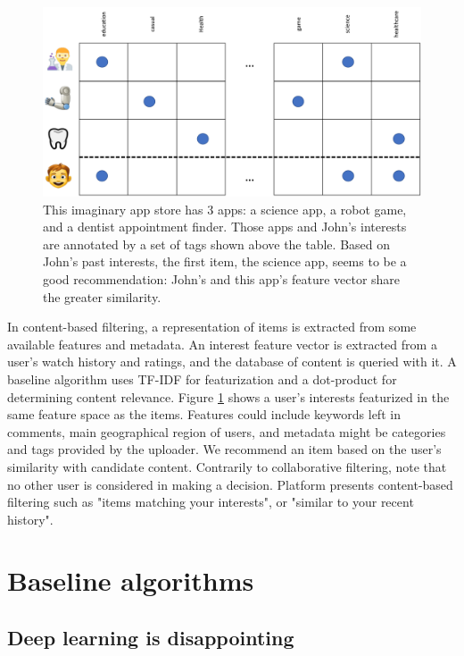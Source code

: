 \begin{figure}
    \centering
    \includegraphics[scale=0.4]{70-files/content-based.pdf}
    \caption{This imaginary app store has 3 apps: a science app, a robot game, and a dentist appointment finder. Those apps and John's interests are annotated by a set of tags shown above the table. Based on John's past interests, the first item, the science app, seems to be a good recommendation: John's and this app's feature vector share the greater similarity.}
    \label{fig:content-based}
\end{figure}

In content-based filtering, a representation of items is extracted from some available features and metadata. An interest feature vector is extracted from a user's watch history and ratings, and the database of content is queried with it. A baseline algorithm uses \ac{TF-IDF} \cite{tfidf} for featurization and a dot-product for determining content relevance. Figure \ref{fig:content-based} shows a user's interests featurized in the same feature space as the items. Features could include keywords left in comments, main geographical region of users, and metadata might be categories and tags provided by the uploader. We recommend an item based on the user's similarity with candidate content. Contrarily to collaborative filtering, note that no other user is considered in making a decision. Platform presents content-based filtering such as "items matching your interests", or "similar to your recent history".

\section{Baseline algorithms}

\subsection{Deep learning is disappointing}

